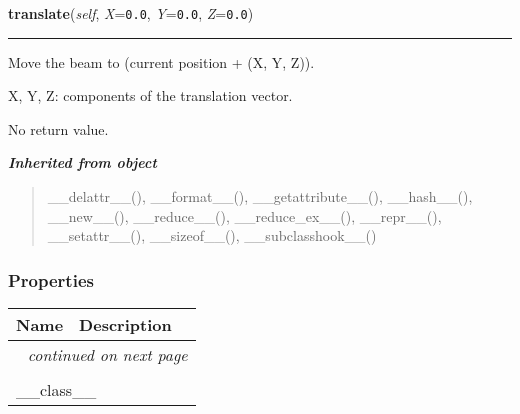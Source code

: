     \label{theia:optics:beam:GaussianBeam:translate}

    \vspace{0.5ex}

\hspace{.8\funcindent}\begin{boxedminipage}{\funcwidth}

    \raggedright \textbf{translate}(\textit{self}, \textit{X}={\tt 0.0}, \textit{Y}={\tt 0.0}, \textit{Z}={\tt 0.0})

    \vspace{-1.5ex}

    \rule{\textwidth}{0.5\fboxrule}
\setlength{\parskip}{2ex}
    Move the beam to (current position + (X, Y, Z)).

    X, Y, Z: components of the translation vector.

    No return value.

\setlength{\parskip}{1ex}
    \end{boxedminipage}


\large{\textbf{\textit{Inherited from object}}}

\begin{quote}
\_\_delattr\_\_(), \_\_format\_\_(), \_\_getattribute\_\_(), \_\_hash\_\_(), \_\_new\_\_(), \_\_reduce\_\_(), \_\_reduce\_ex\_\_(), \_\_repr\_\_(), \_\_setattr\_\_(), \_\_sizeof\_\_(), \_\_subclasshook\_\_()
\end{quote}


  \subsubsection{Properties}

    \vspace{-1cm}
\hspace{\varindent}\begin{longtable}{|p{\varnamewidth}|p{\vardescrwidth}|l}
\cline{1-2}
\cline{1-2} \centering \textbf{Name} & \centering \textbf{Description}& \\
\cline{1-2}
\endhead\cline{1-2}\multicolumn{3}{r}{\small\textit{continued on next page}}\\\endfoot\cline{1-2}
\endlastfoot\multicolumn{2}{|l|}{\textit{Inherited from object}}\\
\multicolumn{2}{|p{\varwidth}|}{\raggedright \_\_class\_\_}\\
\cline{1-2}
\end{longtable}


